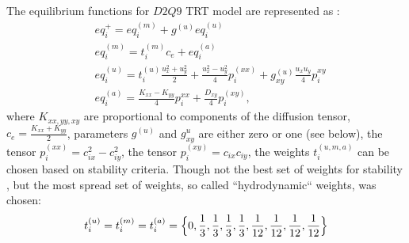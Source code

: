 \documentclass{article}
\begin{document}
The equilibrium functions for $D2Q9$ TRT model are represented as \cite{kuzmin-stability-optimal}:
\begin{equation}
\begin{aligned}
&eq_i^{+}=eq_i^{(m)}+g^{(u)} eq_i^{(u)}\\
&eq_i^{(m)}=t_i^{(m)} c_e+ eq_i^{(a)}\\
&eq_i^{(u)}=t_i^{(u)} \frac{u_x^2+u_y^2}{2}+\frac{u_x^2-u_y^2}{4} p_i^{(xx)}+g_{xy}^{(u)}\frac{u_x
u_y}{4} p_i^{xy}\\
&eq_i^{(a)}=\frac{K_{xx}-K_{yy}}{4} p_i^{xx}+\frac{D_{xy}}{4} p_i^{(xy)},
\end{aligned}
\end{equation}
where $K_{xx,yy,xy}$ are proportional to components of the diffusion tensor,
$c_e=\frac{K_{xx}+K_{yy}}{2}$, parameters $g^{(u)}$ and $g^{u}_{xy}$ are either zero or one (see
below), the tensor $p_i^{(xx)}=c_{ix}^2-c_{iy}^2$, the tensor $p_i^{(xy)}=c_{ix} c_{iy}$, the
weights
$t_i^{(u,m,a)}$ can be chosen based on stability criteria. Though not the best set of weights for
stability \cite{kuzmin-stability-optimal}, but the most spread set of weights, so called
``hydrodynamic`` weights, was chosen:
\begin{equation}
t_i^{(u)}=t_i^{(m)}=t_i^{(a)}=\Bigl\{0,\frac{1}{3},\frac{1}{3},\frac{1}{3},\frac{1}{3},\frac{1}{12},
\frac {1}{12},\frac{1}{12},\frac{1}{12}\Bigr\}
\end{equation}
 
\end{document}

